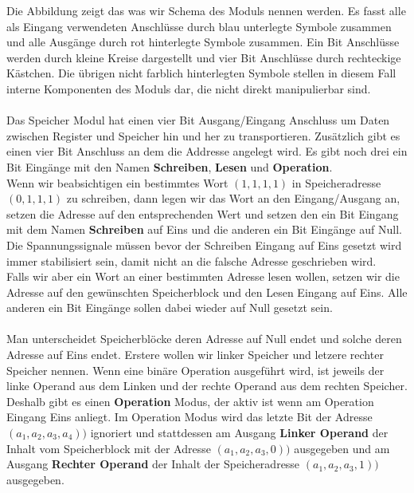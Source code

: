 \documentclass[11pt,a4paper,leqno]{report}
\numberwithin{equation}{chapter}
\begin{document}
\noindent
Die Abbildung zeigt das was wir Schema des Moduls nennen werden. Es fasst alle als Eingang verwendeten Anschl\"usse durch blau unterlegte Symbole zusammen und alle Ausg\"ange durch rot hinterlegte Symbole zusammen. Ein Bit Anschl\"usse werden durch kleine Kreise dargestellt und vier Bit Anschl\"usse durch rechteckige K\"astchen. 
Die \"ubrigen nicht farblich hinterlegten Symbole stellen in diesem Fall interne Komponenten des Moduls dar, die nicht direkt manipulierbar sind.\\
\\
Das Speicher Modul hat einen vier Bit Ausgang/Eingang Anschluss um Daten zwischen Register und Speicher hin und her zu transportieren. Zus\"atzlich gibt es einen vier Bit Anschluss an dem die Addresse angelegt wird.
Es gibt noch drei ein Bit Eing\"ange mit den Namen \textbf{Schreiben}, \textbf{Lesen} und \textbf{Operation}.\\
Wenn wir beabsichtigen ein bestimmtes Wort $(1,1,1,1)$ in Speicheradresse $(0,1,1,1)$ zu schreiben, dann legen wir das Wort an den Eingang/Ausgang an, setzen die Adresse auf den entsprechenden Wert und setzen den ein Bit Eingang mit dem Namen \textbf{Schreiben} auf Eins und die anderen ein Bit Eing\"ange auf Null.\\
Die Spannungssignale m\"ussen bevor der Schreiben Eingang auf Eins gesetzt wird immer stabilisiert sein, damit nicht an die falsche Adresse geschrieben wird.\\
Falls wir aber ein Wort an einer bestimmten Adresse lesen wollen, setzen wir die Adresse auf den gew\"unschten Speicherblock und den Lesen Eingang auf Eins. Alle anderen ein Bit Eing\"ange sollen dabei wieder auf Null gesetzt sein.\\
\\
Man unterscheidet Speicherbl\"ocke deren Adresse auf Null endet und solche deren Adresse auf Eins endet. Erstere wollen wir linker Speicher und letzere rechter Speicher nennen. Wenn eine bin\"are Operation ausgef\"uhrt wird, ist jeweils der linke Operand aus dem Linken und der rechte Operand aus dem rechten Speicher.\\
Deshalb gibt es einen \textbf{Operation} Modus, der aktiv ist wenn am Operation Eingang Eins anliegt. Im Operation Modus wird das letzte Bit der Adresse $(a_1, a_2, a_3, a_4))$ ignoriert und stattdessen am Ausgang \textbf{Linker Operand} der Inhalt vom Speicherblock mit der Adresse $(a_1, a_2, a_3, 0))$ ausgegeben und am Ausgang \textbf{Rechter Operand} der Inhalt der Speicheradresse $(a_1, a_2, a_3, 1))$ ausgegeben.
\end{document}
